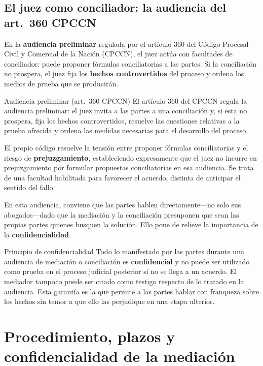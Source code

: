 \documentclass[12pt,oneside]{book}
\begin{document}
\subsection{El juez como conciliador: la audiencia del art.\ 360 CPCCN}

En la \textbf{audiencia preliminar} regulada por el artículo 360 del
Código Procesal Civil y Comercial de la Nación (CPCCN), el juez actúa
con facultades de conciliador: puede proponer fórmulas conciliatorias
a las partes. Si la conciliación no prospera, el juez fija los
\textbf{hechos controvertidos} del proceso y ordena los medios de prueba
que se producirán.

\begin{normref}{Audiencia preliminar (art.\ 360 CPCCN)}
El artículo 360 del CPCCN regula la audiencia preliminar: el juez
invita a las partes a una conciliación y, si esta no prospera, fija
los hechos controvertidos, resuelve las cuestiones relativas a la
prueba ofrecida y ordena las medidas necesarias para el desarrollo
del proceso.
\end{normref}

\begin{note}
El propio código resuelve la tensión entre proponer fórmulas
conciliatorias y el riesgo de \textbf{prejuzgamiento}, estableciendo
expresamente que el juez no incurre en prejuzgamiento por formular
propuestas conciliatorias en esa audiencia. Se trata de una facultad
habilitada para favorecer el acuerdo, distinta de anticipar el sentido
del fallo.
\end{note}

En esta audiencia, conviene que las partes hablen directamente---no
solo sus abogados---dado que la mediación y la conciliación presuponen
que sean las propias partes quienes busquen la solución. Ello pone de
relieve la importancia de la \textbf{confidencialidad}.

\begin{definition}{Principio de confidencialidad}
Todo lo manifestado por las partes durante una audiencia de mediación
o conciliación es \textbf{confidencial} y no puede ser utilizado como
prueba en el proceso judicial posterior si no se llega a un acuerdo.
El mediador tampoco puede ser citado como testigo respecto de lo
tratado en la audiencia. Esta garantía es la que permite a las partes
hablar con franqueza sobre los hechos sin temor a que ello las
perjudique en una etapa ulterior.
\end{definition}

\section{Procedimiento, plazos y confidencialidad de la mediaci\'on}
\end{document}

